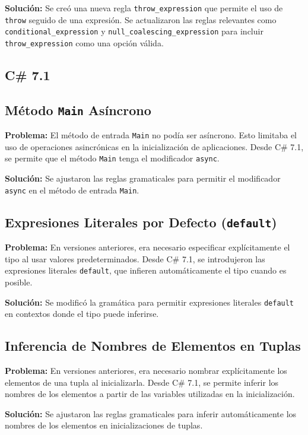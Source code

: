\textbf{Solución:} Se creó una nueva regla \texttt{throw\_expression} que permite el uso de \texttt{throw} seguido de una expresión. Se actualizaron las reglas relevantes como \texttt{conditional\_expression}  y  \texttt{null\_coalescing\_expression}  para  incluir \\
\texttt{throw\_expression} como una opción válida.


\subsection*{C\# 7.1}

\subsection*{Método \texttt{Main} Asíncrono}
\textbf{Problema:} El método de entrada \texttt{Main} no podía ser asíncrono. Esto limitaba el uso de operaciones asincrónicas en la inicialización de aplicaciones. Desde C\# 7.1, se permite que el método \texttt{Main} tenga el modificador \texttt{async}.

\textbf{Solución:} Se ajustaron las reglas gramaticales para permitir el modificador \texttt{async} en el método de entrada \texttt{Main}.

\subsection*{Expresiones Literales por Defecto (\texttt{default})}
\textbf{Problema:} En versiones anteriores, era necesario especificar explícitamente el tipo al usar valores predeterminados. Desde C\# 7.1, se introdujeron las expresiones literales \texttt{default}, que infieren automáticamente el tipo cuando es posible.

\textbf{Solución:} Se modificó la gramática para permitir expresiones literales \texttt{default} en contextos donde el tipo puede inferirse.

\subsection*{Inferencia de Nombres de Elementos en Tuplas}
\textbf{Problema:} En versiones anteriores, era necesario nombrar explícitamente los elementos de una tupla al inicializarla. Desde C\# 7.1, se permite inferir los nombres de los elementos a partir de las variables utilizadas en la inicialización.

\textbf{Solución:} Se ajustaron las reglas gramaticales para inferir automáticamente los nombres de los elementos en inicializaciones de tuplas.

